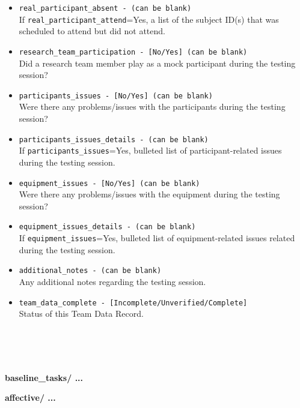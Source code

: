 \begin{description}
\begin{addmargin}[0em]{0em}
\begin{itemize}
            \item \verb|real_participant_absent - (can be blank)|\\If \verb|real_participant_attend|=Yes, a list of the subject ID(s) that was scheduled to attend but did not attend.
            \item \verb|research_team_participation - [No/Yes] (can be blank)|\\Did a research team member play as a mock participant during the testing session?
            \item \verb|participants_issues - [No/Yes] (can be blank)|\\Were there any problems/issues with the participants during the testing session?
            \item \verb|participants_issues_details - (can be blank)|\\If \verb|participants_issues|=Yes, bulleted list of participant-related issues during the testing session.
            \item \verb|equipment_issues - [No/Yes] (can be blank)|\\Were there any problems/issues with the equipment during the testing session?
            \item \verb|equipment_issues_details - (can be blank)|\\If \verb|equipment_issues|=Yes, bulleted list of equipment-related issues related during the testing session.
            \item \verb|additional_notes - (can be blank)|\\Any additional notes regarding the testing session.
            \item \verb|team_data_complete - [Incomplete/Unverified/Complete]|\\Status of this Team Data Record.
        \end{itemize}
    \end{addmargin} %



\textbf{\\\\\\}
\item\textbf{baseline\_tasks/ ...}
    \begin{addmargin}[0em]{0em} %
        \textbf{affective/ ...}


\end{addmargin}
\end{description}
